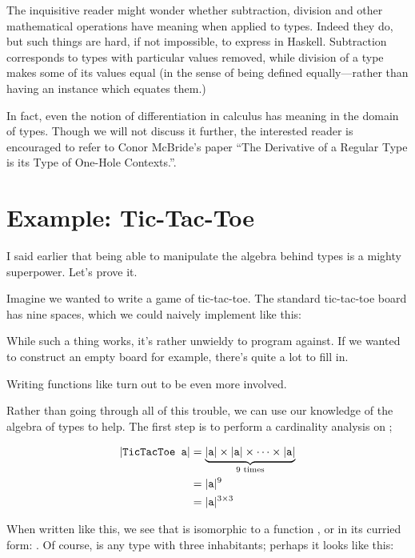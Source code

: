 \documentclass[book.tex]{subfiles}
\begin{document}
The inquisitive reader might wonder whether subtraction, division and other
mathematical operations have meaning when applied to types. Indeed they do, but
such things are hard, if not impossible, to express in Haskell. Subtraction
corresponds to types with particular values removed, while division of a type
makes some of its values equal (in the sense of being defined equally---rather
than having an  instance which equates them.)

In fact, even the notion of differentiation in calculus has meaning in the
domain of types. Though we will not discuss it further, the interested reader is
encouraged to refer to Conor McBride's paper ``The Derivative of a Regular Type
is its Type of One-Hole Contexts.''\cite{one-hole}.


\section{Example: Tic-Tac-Toe}

I said earlier that being able to manipulate the algebra behind types is a
mighty superpower. Let's prove it.

Imagine we wanted to write a game of tic-tac-toe. The standard tic-tac-toe board
has nine spaces, which we could naively implement like this:


While such a thing works, it's rather unwieldy to program against. If we wanted
to construct an empty board for example, there's quite a lot to fill in.


Writing functions like  turn out to be even more involved.

Rather than going through all of this trouble, we can use our knowledge of the
algebra of types to help. The first step is to perform a cardinality analysis on
;

\begin{align*}
  \lvert\texttt{TicTacToe a}\rvert &= \underbrace{\lvert\texttt{a}\rvert \times \lvert\texttt{a}\rvert \times \cdots
  \times \lvert\texttt{a}\rvert}_{9 \text{ times}} \\
    &= \lvert\texttt{a}\rvert^{9} \\
    &= \lvert\texttt{a}\rvert^{3\times 3}
\end{align*}

When written like this, we see that  is isomorphic to a function
, or in its curried form: . Of
course,  is any type with three inhabitants; perhaps it looks like
this:
\end{document}

